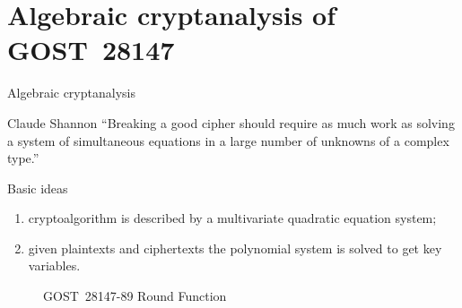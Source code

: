 \documentclass[10pt, ucs]{beamer}
\begin{document}
\section{Algebraic cryptanalysis of GOST~28147}
\begin{frame}{Algebraic cryptanalysis}
    \begin{block}{Claude Shannon}
        ``Breaking a good cipher should require as much work as solving a system of
        simultaneous equations in a large number of unknowns of a complex type.''
    \end{block}
    \begin{minipage}[t]{0.5\textwidth}
        \begin{block}{Basic ideas}
            \begin{enumerate}
                \item cryptoalgorithm is described by a multivariate quadratic equation system;
                \item given plaintexts and ciphertexts the polynomial system is
                    solved to get key variables.
            \end{enumerate}
        \end{block}
    \end{minipage}%
    \hspace*{1ex}
    \begin{minipage}[t]{0.5\textwidth}
        \begin{figure}[htbp]
            \centering
            
            \caption{GOST~28147-89 Round Function}
        \end{figure}
    \end{minipage}%
\end{frame}
\end{document}
